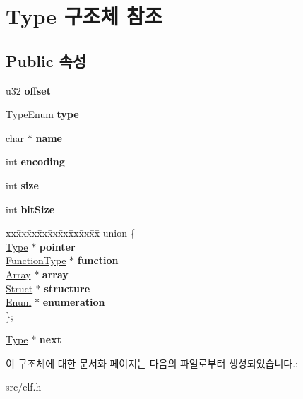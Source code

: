 \hypertarget{struct_type}{}\section{Type 구조체 참조}
\label{struct_type}
\subsection*{Public 속성}
\begin{DoxyCompactItemize}
\item 
\mbox{\label{struct_type_a1da9bf1a40d9e23c0c03b291b00e7521}} 
u32 {\bfseries offset}
\item 
\mbox{\label{struct_type_a22ff3703af18731e0965866dab0a219f}} 
Type\+Enum {\bfseries type}
\item 
\mbox{\label{struct_type_a40204c03d16be33365f3ebfc8f0efdc6}} 
char $\ast$ {\bfseries name}
\item 
\mbox{\label{struct_type_a8a28b973d98063a67755e710d6383feb}} 
int {\bfseries encoding}
\item 
\mbox{\label{struct_type_a871302dc63ac1a37c0b6a225cf82048d}} 
int {\bfseries size}
\item 
\mbox{\label{struct_type_a15eb0924ca4d483bf9dd0d7e4029b60c}} 
int {\bfseries bit\+Size}
\item 
\mbox{\label{struct_type_a6ec0777bfd5d60479a928f2253ef397f}} 
\begin{tabbing}
xx\=xx\=xx\=xx\=xx\=xx\=xx\=xx\=xx\=\kill
union \{\\
\>\mbox{\hyperlink{struct_type}{Type}} $\ast$ {\bfseries pointer}\\
\>\mbox{\hyperlink{struct_function_type}{FunctionType}} $\ast$ {\bfseries function}\\
\>\mbox{\hyperlink{struct_array}{Array}} $\ast$ {\bfseries array}\\
\>\mbox{\hyperlink{struct_struct}{Struct}} $\ast$ {\bfseries structure}\\
\>\mbox{\hyperlink{struct_enum}{Enum}} $\ast$ {\bfseries enumeration}\\
\}; \\

\end{tabbing}\item 
\mbox{\label{struct_type_ada2a3b3d0180c6958e699fdc870fdbba}} 
\mbox{\hyperlink{struct_type}{Type}} $\ast$ {\bfseries next}
\end{DoxyCompactItemize}


이 구조체에 대한 문서화 페이지는 다음의 파일로부터 생성되었습니다.\+:\begin{DoxyCompactItemize}
\item 
src/elf.\+h\end{DoxyCompactItemize}
